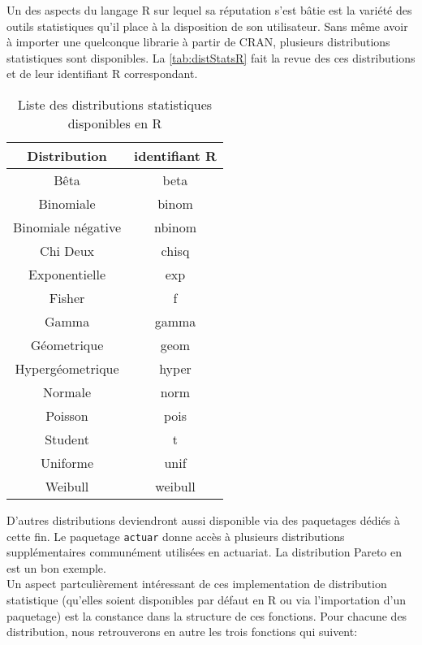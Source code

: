 Un des aspects du langage R sur lequel sa réputation s'est bâtie est la variété des outils statistiques qu'il place à la disposition de son utilisateur. Sans même avoir à importer une quelconque librarie à partir de CRAN, plusieurs distributions statistiques sont disponibles. La \autoref{tab:distStatsR} fait la revue des ces distributions et de leur identifiant R correspondant. \cite{distStatsR} \\

\begin{table}[h]
	\centering
	\begin{tabular}{cc}
		\textbf{Distribution} & \textbf{identifiant R} \\
		\hline
		Bêta & beta \\
		Binomiale & binom \\
		Binomiale négative & nbinom \\
		Chi Deux & chisq \\
		Exponentielle & exp \\
		Fisher & f \\
		Gamma & gamma \\
		Géometrique & geom \\
		Hypergéometrique & hyper \\
		Normale & norm \\
		Poisson & pois \\
		Student & t \\
		Uniforme & unif \\
		Weibull & weibull	
	\end{tabular}
	\caption{Liste des distributions statistiques disponibles en R}
\end{table}
\label{tab:distStatsR}

D'autres distributions deviendront aussi disponible via des paquetages dédiés à cette fin. Le paquetage \texttt{actuar} donne accès à plusieurs distributions supplémentaires communément utilisées en actuariat. La distribution Pareto en est un bon exemple. \\

Un aspect partculièrement intéressant de ces implementation de distribution statistique (qu'elles soient disponibles par défaut en R ou via l'importation d'un paquetage) est la constance dans la structure de ces fonctions. Pour chacune des distribution, nous retrouverons en autre les trois fonctions qui suivent: \\

